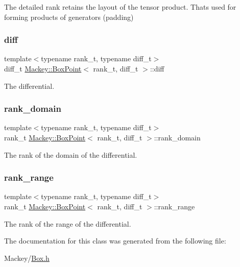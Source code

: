 The detailed rank retains the layout of the tensor product. That\textquotesingle{}s used for forming products of generators (padding) 

\mbox{\label{classMackey_1_1BoxPoint_affefee2b62f4168ed778d96dc219ef6f}} 
\subsubsection{\texorpdfstring{diff}{diff}}
{\footnotesize\ttfamily template$<$typename rank\+\_\+t, typename diff\+\_\+t$>$ \\
diff\+\_\+t \hyperlink{classMackey_1_1BoxPoint}{Mackey\+::\+Box\+Point}$<$ rank\+\_\+t, diff\+\_\+t $>$\+::diff}



The differential. 

\mbox{\label{classMackey_1_1BoxPoint_a160dd950c1ffbed689d650f4d0fadbec}} 
\subsubsection{\texorpdfstring{rank\+\_\+domain}{rank\_domain}}
{\footnotesize\ttfamily template$<$typename rank\+\_\+t, typename diff\+\_\+t$>$ \\
rank\+\_\+t \hyperlink{classMackey_1_1BoxPoint}{Mackey\+::\+Box\+Point}$<$ rank\+\_\+t, diff\+\_\+t $>$\+::rank\+\_\+domain}



The rank of the domain of the differential. 

\mbox{\label{classMackey_1_1BoxPoint_ab24bd5a38df100f88c8637d71dbdf608}} 
\subsubsection{\texorpdfstring{rank\+\_\+range}{rank\_range}}
{\footnotesize\ttfamily template$<$typename rank\+\_\+t, typename diff\+\_\+t$>$ \\
rank\+\_\+t \hyperlink{classMackey_1_1BoxPoint}{Mackey\+::\+Box\+Point}$<$ rank\+\_\+t, diff\+\_\+t $>$\+::rank\+\_\+range}



The rank of the range of the differential. 



The documentation for this class was generated from the following file\+:\begin{DoxyCompactItemize}
\item 
Mackey/\hyperlink{Box_8h}{Box.\+h}\end{DoxyCompactItemize}
